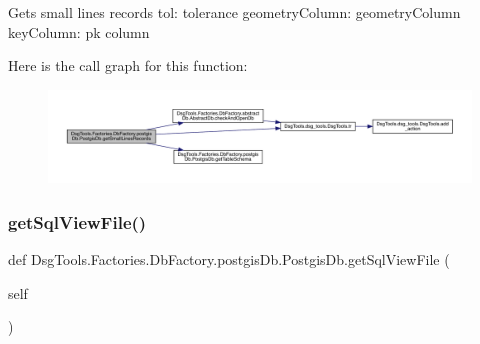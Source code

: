 \begin{DoxyVerb}Gets small lines records 
tol: tolerance
geometryColumn: geometryColumn
keyColumn: pk column
\end{DoxyVerb}
 Here is the call graph for this function\+:
\nopagebreak
\begin{figure}[H]
\begin{center}
\leavevmode
\includegraphics[width=350pt]{class_dsg_tools_1_1_factories_1_1_db_factory_1_1postgis_db_1_1_postgis_db_ac61e0946b1f045ff03840a5bbb7bd339_cgraph}
\end{center}
\end{figure}
\mbox{\label{class_dsg_tools_1_1_factories_1_1_db_factory_1_1postgis_db_1_1_postgis_db_a2712a02bf8c2cb9bef4245b7be7ba6bd}} 
\subsubsection{\texorpdfstring{get\+Sql\+View\+File()}{getSqlViewFile()}}
{\footnotesize\ttfamily def Dsg\+Tools.\+Factories.\+Db\+Factory.\+postgis\+Db.\+Postgis\+Db.\+get\+Sql\+View\+File (\begin{DoxyParamCaption}\item[{}]{self }\end{DoxyParamCaption})}

